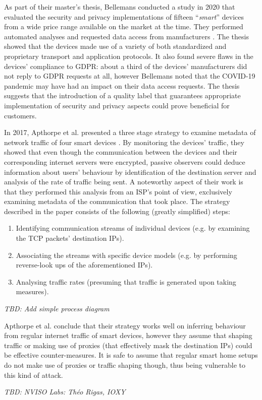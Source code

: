 As part of their master's thesis, Bellemans conducted a study in 2020 that evaluated the security and privacy implementations of fifteen \enquote{\emph{smart}} devices from a wide price range available on the market at the time. They performed automated analyses and requested data access from manufacturers \cite{JonahBellemans}. The thesis showed that the devices made use of a variety of both standardized and proprietary transport and application protocols. It also found severe flaws in the devices' compliance to \ac{GDPR}: about a third of the devices' manufacturers did not reply to \ac{GDPR} requests at all, however Bellemans noted that the COVID-19 pandemic may have had an impact on their data access requests. The thesis suggests that the introduction of a quality label that guarantees appropriate implementation of security and privacy aspects could prove beneficial for customers. \par
In 2017, Apthorpe et al. presented a three stage strategy to examine metadata of network traffic of four smart devices \cite{apthorpe2017smart}. %
By monitoring the devices' traffic, they showed that even though the communication between the devices and their corresponding internet servers were encrypted, passive observers could deduce information about users' behaviour by identification of the destination server and analysis of the rate of traffic being sent. A noteworthy aspect of their work is that they performed this analysis from an \ac{ISP}'s point of view, exclusively examining metadata of the communication that took place. The strategy described in the paper consists of the following (greatly simplified) steps:
\begin{enumerate}
    \item Identifying communication streams of individual devices (e.g. by examining the TCP packets' destination IPs).
    \item Associating the streams with specific device models (e.g. by performing reverse-look ups of the aforementioned IPs).
    \item Analysing traffic rates (presuming that traffic is generated upon taking measures).
\end{enumerate}
\emph{TBD: Add simple process diagram} %


Apthorpe et al. conclude that their strategy works well on inferring behaviour from regular internet traffic of smart devices, however they assume that shaping traffic or making use of proxies (that effectively mask the destination IPs) could be effective counter-measures. It is safe to assume that regular smart home setups do not make use of proxies or traffic shaping though, thus being vulnerable to this kind of attack. \par
\emph{TBD: NVISO Labs: Théo Rigas, IOXY \cite{rigas_ioxy}} %

